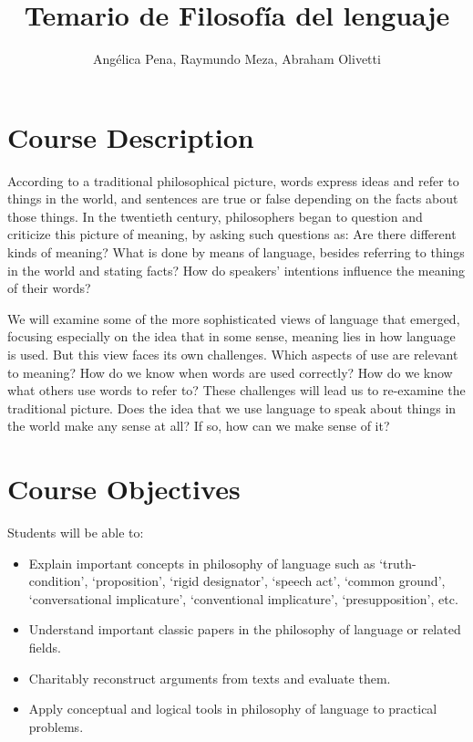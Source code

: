 \documentclass{tufte-handout}
\title{Temario de Filosofía del lenguaje}
\author{Angélica Pena,
        Raymundo Meza,
        Abraham Olivetti
       }
\date{}
\begin{document}
\maketitle

\section{\textbf{Course Description}}

According to a traditional philosophical picture, words express ideas
and refer to things in the world, and sentences are true or false
depending on the facts about those things. In the twentieth century,
philosophers began to question and criticize this picture of meaning,
by asking such questions as: Are there different kinds of meaning?
What is done by means of language, besides referring to things in the
world and stating facts? How do speakers’ intentions influence the
meaning of their words?

We will examine some of the more sophisticated views of language that
emerged, focusing especially on the idea that in some sense, meaning
lies in how language is used. But this view faces its own challenges.
Which aspects of use are relevant to meaning? How do we know when
words are used correctly? How do we know what others use words to
refer to? These challenges will lead us to re-examine the traditional
picture. Does the idea that we use language to speak about things in
the world make any sense at all? If so, how can we make sense of it?

\section{\textbf{Course Objectives}}

Students will be able to:

\begin{itemize}

\item Explain important concepts in philosophy of language such as `truth-condition', `proposition', `rigid designator', `speech act', `common ground', `conversational implicature', `conventional implicature', `presupposition', etc.

\item Understand important classic papers in the philosophy of language or related fields.

\item Charitably reconstruct arguments from texts and evaluate them.

\item Apply conceptual and logical tools in philosophy of language to practical problems.

\end{itemize}
\end{document}
